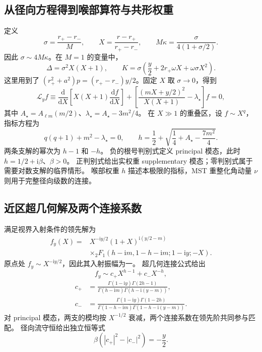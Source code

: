 \documentclass[UTF8,fontset=fandol,11pt,a4paper]{ctexart}
\newcommand{\ii}{\mathrm{i}}
\newcommand{\dd}{\mathrm{d}}
\numberwithin{equation}{section}
\begin{document}
\subsection{从径向方程得到喉部算符与共形权重}
定义
\begin{equation}
\sigma=\frac{r_+-r_-}{M},\qquad
X=\frac{r-r_+}{r_+-r_-},\qquad
M\kappa=\frac{\sigma}{4(1+\sigma/2)}.
\end{equation}
因此 $\sigma\sim4M\kappa$。在 $M=1$ 的变量中，
\begin{equation}
\Delta=\sigma^2X(X+1),\qquad
K=\sigma\left(\frac y2+2r_+\omega X+\omega\sigma X^2\right).
\end{equation}
这里用到了 $(r_+^2+a^2)p=(r_+-r_-)y/2$。固定 $X$ 取 $\sigma\to0$，得到
\begin{equation}
\mathcal L_y f\equiv
\frac{\dd}{\dd X}\left[X(X+1)\frac{\dd f}{\dd X}\right]
+\left[\frac{(mX+y/2)^2}{X(X+1)}-\lambda_\star\right]f=0,
\label{eq:near-operator-v2}
\end{equation}
其中 $A_\star=A_{\ell m}(m/2)$、$\lambda_\star=A_\star-3m^2/4$。
在 $X\gg1$ 的重叠区，设 $f\sim X^q$，指标方程为
\begin{equation}
q(q+1)+m^2-\lambda_\star=0,
\qquad
h=\frac12+\sqrt{\frac14+A_\star-\frac{7m^2}{4}}.
\end{equation}
两条支解的幂次为 $h-1$ 和 $-h$。
负的根号判别式定义 principal 模态，此时 $h=1/2+\ii\beta$、$\beta>0$。
正判别式给出实权重 supplementary 模态；零判别式属于需要对数支解的临界情形。
喉部权重 $h$ 描述本极限的指标，MST 重整化角动量 $\nu$ 则用于完整径向级数的连接。

\subsection{近区超几何解及两个连接系数}
满足视界入射条件的领先解为
\begin{equation}
\begin{split}
f_y(X)={}&X^{-\ii y/2}(1+X)^{\ii(y/2-m)}\\
&\times{}_2F_1(h-\ii m,1-h-\ii m;1-\ii y;-X).
\end{split}
\label{eq:near-f-v2}
\end{equation}
原点处 $f_y\sim X^{-\ii y/2}$，因此其入射振幅为一。
超几何连接公式给出
\begin{equation}
f_y\sim c_+X^{h-1}+c_-X^{-h},
\end{equation}
\begin{align}
c_+&=\frac{\Gamma(1-\ii y)\Gamma(2h-1)}
{\Gamma(h-\ii m)\Gamma(h-\ii(y-m))},\\
c_-&=\frac{\Gamma(1-\ii y)\Gamma(1-2h)}
{\Gamma(1-h-\ii m)\Gamma(1-h-\ii(y-m))}.
\end{align}
对 principal 模态，两支的模均按 $X^{-1/2}$ 衰减，两个连接系数在领先阶共同参与匹配。
径向流守恒给出独立恒等式
\begin{equation}
\beta(|c_+|^2-|c_-|^2)=-\frac y2.
\label{eq:near-current-v2}
\end{equation}
\end{document}
